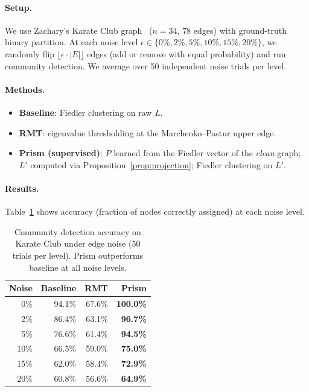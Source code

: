 \documentclass[11pt]{article}
\newcommand{\LP}{L'}
\begin{document}
\paragraph{Setup.}
We use Zachary's Karate Club graph~\cite{Zachary1977} ($n = 34$,
$78$ edges) with ground-truth binary partition.
At each noise level $\epsilon \in \{0\%, 2\%, 5\%, 10\%, 15\%, 20\%\}$,
we randomly flip $\lfloor \epsilon \cdot |E| \rfloor$ edges (add or
remove with equal probability) and run community detection.
We average over 50 independent noise trials per level.

\paragraph{Methods.}
\begin{itemize}
  \item \textbf{Baseline}: Fiedler clustering on raw $L$.
  \item \textbf{RMT}: eigenvalue thresholding at the Marchenko--Pastur
        upper edge.
  \item \textbf{Prism (supervised)}: $P$ learned from the Fiedler vector
        of the \emph{clean} graph; $\LP$ computed via
        Proposition~\ref{prop:projection}; Fiedler clustering on $\LP$.
\end{itemize}

\paragraph{Results.}
Table~\ref{tab:noise} shows accuracy (fraction of nodes correctly
assigned) at each noise level.

\begin{table}[h]
\centering
\caption{Community detection accuracy on Karate Club under edge noise
(50 trials per level). Prism outperforms baseline at all noise levels.}
\label{tab:noise}
\begin{tabular}{rrrr}
\toprule
Noise & Baseline & RMT & Prism \\
\midrule
 0\% & 94.1\% & 67.6\% & \textbf{100.0\%} \\
 2\% & 86.4\% & 63.1\% & \textbf{96.7\%} \\
 5\% & 76.6\% & 61.4\% & \textbf{94.5\%} \\
10\% & 66.5\% & 59.0\% & \textbf{75.0\%} \\
15\% & 62.0\% & 58.4\% & \textbf{72.9\%} \\
20\% & 60.8\% & 56.6\% & \textbf{64.9\%} \\
\bottomrule
\end{tabular}
\end{table}
\end{document}

